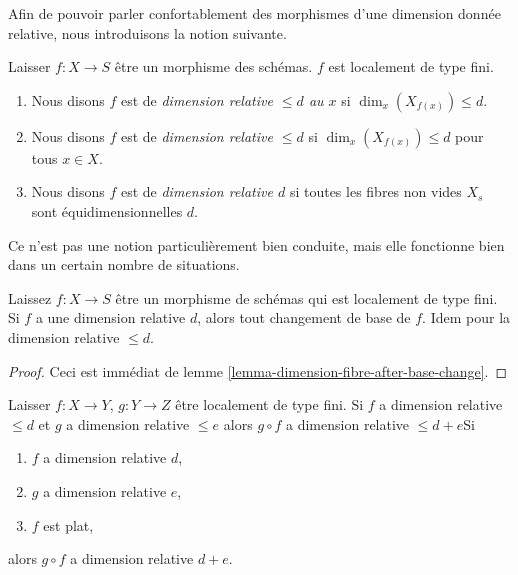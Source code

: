 \noindent
Afin de pouvoir parler confortablement des morphismes d'une dimension donnée relative, nous introduisons la notion suivante.

\begin{definition}

\label{definition-relative-dimension-d}

Laisser $f : X \to S$ être un morphisme des schémas. $f$ est localement de type fini.

\begin{enumerate}

\item Nous disons $f$ est de {\it dimension relative $\leq d$ au $x$} si $\dim_x(X_{f(x)}) \leq d$.
\item Nous disons $f$ est de {\it dimension relative $\leq d$} si $\dim_x(X_{f(x)}) \leq d$ pour tous $x \in X$.
\item Nous disons $f$ est de {\it dimension relative $d$} si toutes les fibres non vides $X_s$ sont équidimensionnelles $d$.

\end{enumerate}

\end{definition}

\noindent
Ce n'est pas une notion particulièrement bien conduite, mais elle fonctionne bien dans un certain nombre de situations.

\begin{lemma}

\label{lemma-base-change-relative-dimension-d}
Laissez $f : X \to S$ être un morphisme de schémas qui est localement de type fini. Si $f$ a une dimension relative $d$, alors tout changement de base de $f$. Idem pour la dimension relative $\leq d$.
\end{lemma}

\begin{proof}
Ceci est immédiat de lemme \ref{lemma-dimension-fibre-after-base-change}.
\end{proof}

\begin{lemma}

\label{lemma-composition-relative-dimension-d}

Laisser $f : X \to Y$, $g : Y \to Z$ être localement de type fini. Si $f$ a dimension relative $\leq d$ et $g$ a dimension relative $\leq e$
alors $g \circ f$ a dimension relative $\leq d + e$Si

\begin{enumerate}

\item  $f$ a dimension relative $d$,
\item  $g$ a dimension relative $e$,
\item  $f$ est plat,

\end{enumerate}

alors $g \circ f$ a dimension relative $d + e$.

\end{lemma}

